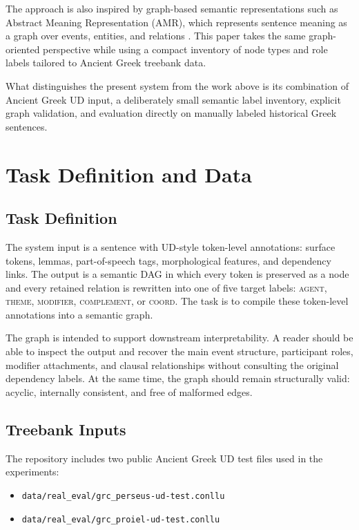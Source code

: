 \documentclass[11pt]{article}
\begin{document}
The approach is also inspired by graph-based semantic representations such as
Abstract Meaning Representation (AMR), which represents sentence meaning as a
graph over events, entities, and relations \citep{banarescu2013amr}. This
paper takes the same graph-oriented perspective while using a compact inventory
of node types and role labels tailored to Ancient Greek treebank data.

What distinguishes the present system from the work above is its combination of
Ancient Greek UD input, a deliberately small semantic label inventory, explicit
graph validation, and evaluation directly on manually labeled historical Greek
sentences.

\section{Task Definition and Data}
\subsection{Task Definition}
The system input is a sentence with UD-style token-level annotations: surface
tokens, lemmas, part-of-speech tags, morphological features, and dependency
links. The output is a semantic DAG in which every token is preserved as a node
and every retained relation is rewritten into one of five target labels:
\textsc{agent}, \textsc{theme}, \textsc{modifier}, \textsc{complement}, or
\textsc{coord}. The task is to compile these token-level annotations into a
semantic graph.

The graph is intended to support downstream interpretability. A reader should be
able to inspect the output and recover the main event structure, participant
roles, modifier attachments, and clausal relationships without consulting the
original dependency labels. At the same time, the graph should remain
structurally valid: acyclic, internally consistent, and free of malformed edges.

\subsection{Treebank Inputs}
The repository includes two public Ancient Greek UD test files used in the
experiments:

\begin{itemize}
  \item \texttt{data/real\_eval/grc\_perseus-ud-test.conllu}
  \item \texttt{data/real\_eval/grc\_proiel-ud-test.conllu}
\end{itemize}
\end{document}
